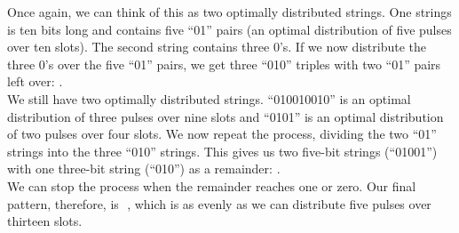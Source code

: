\documentclass[main.tex]{subfiles}
\begin{document}
Once again, we can think of this as two optimally distributed strings. One strings is ten bits long and contains five “01” pairs (an optimal distribution of five pulses over ten slots). The second string contains three 0’s. If we now distribute the three 0’s over the five “01” pairs, we get three “010” triples with two “01” pairs left over: \begin{math}[010][010][010] [01][01]\end{math}.\\
We still have two optimally distributed strings. “010010010” is an optimal distribution of three pulses over nine slots and “0101” is an optimal distribution of two pulses over four slots. We now repeat the process, dividing the two “01” strings into the three “010” strings. This gives us two five-bit strings (“01001”) with one three-bit string (“010”) as a remainder: \begin{math}[01001][01001] [010][01]\end{math}.\\
We can stop the process when the remainder reaches one or zero. Our final pattern, therefore, is \begin{math}[0100101001010]\end{math} , which is as evenly as we can distribute five pulses over thirteen slots.
\end{document}
